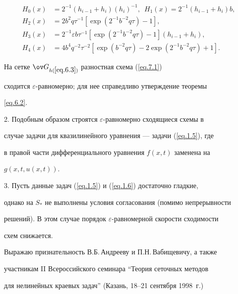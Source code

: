 \begin{align*}


H_0(x)&=2^{-1}(h_{i-1}+h_i){(h_i)}^{-1}, \ \;


H_1(x)=2^{-1}(h_{i-1}+h_i) b, \\


H_2(x)&=2 b^2 q \tau^{-1} [\exp (2^{-1} b^{-2} q \tau)-1],\\


H_3(x)&=2^{-1} \varepsilon b \tau^{-1} [\exp (2^{-1} b^{-2} q \tau)-1]


(h_{i-1}+h_i),\\


H_4(x)&=4 b^4 q^{-2} \tau^{-2} [\exp (b^{-2} q \tau)-2 \exp(2^{-1}


b^{-2} q \tau)+1].


\end{align*}


На сетке $\ov G_{h(\ref{eq.6.3})}$ разностная схема (\ref{eq.7.1})


сходится $\varepsilon$-равномерно; для нее справедливо утверждение теоремы


\ref{eq.6.2}.





2. Подобным образом строятся $\varepsilon$-равномерно сходящиеся схемы в


случае задачи для квазилинейного уравнения --- задачи (\ref{eq.1.5}), где


в правой части дифференциального уравнения $f(x,t)$ заменена на


$g(x,t,u(x, t))$.





3. Пусть данные задач (\ref{eq.1.5}) и (\ref{eq.1.6}) достаточно гладкие,


однако на $S_*$ не выполнены условия согласования (помимо непрерывности


решений). В этом случае порядок $\varepsilon$-равномерной скорости сходимости


схем снижается.


\medskip





Выражаю признательность В.Б.\,Андрееву и П.Н.\,Вабищевичу, а также


участникам II Всероссийского семинара ``Теория сеточных методов


для нелинейных краевых задач'' (Казань, 18--21 сентября 1998~г.)


